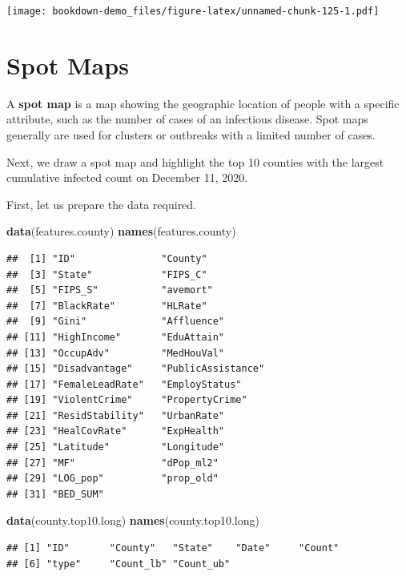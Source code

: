 \documentclass[]{book}
\newenvironment{Shaded}{\begin{snugshade}}{\end{snugshade}}
\newcommand{\KeywordTok}[1]{\textcolor[rgb]{0.13,0.29,0.53}{\textbf{#1}}}
\newcommand{\NormalTok}[1]{#1}
\begin{document}
\texttt{[image: bookdown-demo\_files/figure-latex/unnamed-chunk-125-1.pdf]}

\section{Spot Maps}\label{spot-maps}

A \textbf{spot map} is a map showing the geographic location of people
with a specific attribute, such as the number of cases of an infectious
disease. Spot maps generally are used for clusters or outbreaks with a
limited number of cases.

Next, we draw a spot map and highlight the top 10 counties with the
largest cumulative infected count on December 11, 2020.

First, let us prepare the data required.

\begin{Shaded}
\begin{Highlighting}[]
\KeywordTok{data}\NormalTok{(features.county)}
\KeywordTok{names}\NormalTok{(features.county)}
\end{Highlighting}
\end{Shaded}

\begin{verbatim}
##  [1] "ID"               "County"          
##  [3] "State"            "FIPS_C"          
##  [5] "FIPS_S"           "avemort"         
##  [7] "BlackRate"        "HLRate"          
##  [9] "Gini"             "Affluence"       
## [11] "HighIncome"       "EduAttain"       
## [13] "OccupAdv"         "MedHouVal"       
## [15] "Disadvantage"     "PublicAssistance"
## [17] "FemaleLeadRate"   "EmployStatus"    
## [19] "ViolentCrime"     "PropertyCrime"   
## [21] "ResidStability"   "UrbanRate"       
## [23] "HealCovRate"      "ExpHealth"       
## [25] "Latitude"         "Longitude"       
## [27] "MF"               "dPop_ml2"        
## [29] "LOG_pop"          "prop_old"        
## [31] "BED_SUM"
\end{verbatim}

\begin{Shaded}
\begin{Highlighting}[]
\KeywordTok{data}\NormalTok{(county.top10.long)}
\KeywordTok{names}\NormalTok{(county.top10.long)}
\end{Highlighting}
\end{Shaded}

\begin{verbatim}
## [1] "ID"       "County"   "State"    "Date"     "Count"   
## [6] "type"     "Count_lb" "Count_ub"
\end{verbatim}
\end{document}
